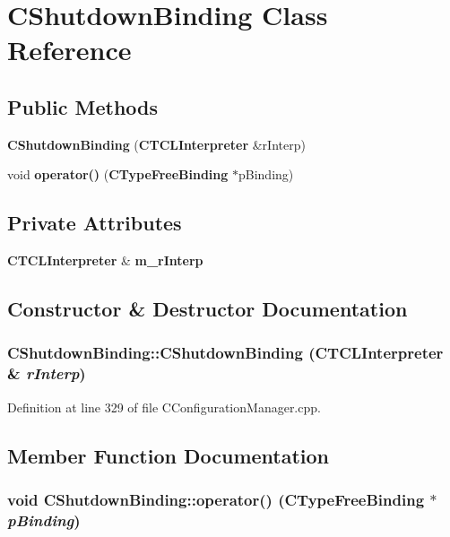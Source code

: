 \section{CShutdown\-Binding  Class Reference}
\label{classCShutdownBinding}
\subsection*{Public Methods}
\begin{CompactItemize}
\item 
{\bf CShutdown\-Binding} ({\bf CTCLInterpreter} \&r\-Interp)
\item 
void {\bf operator()} ({\bf CType\-Free\-Binding} $\ast$p\-Binding)
\end{CompactItemize}
\subsection*{Private Attributes}
\begin{CompactItemize}
\item 
{\bf CTCLInterpreter} \& {\bf m\_\-r\-Interp}
\end{CompactItemize}


\subsection{Constructor \& Destructor Documentation}
\subsubsection{\setlength{\rightskip}{0pt plus 5cm}CShutdown\-Binding::CShutdown\-Binding ({\bf CTCLInterpreter} \& {\em r\-Interp})\hspace{0.3cm}{\tt  [inline]}}\label{classCShutdownBinding_a0}




Definition at line 329 of file CConfiguration\-Manager.cpp.

\subsection{Member Function Documentation}
\subsubsection{\setlength{\rightskip}{0pt plus 5cm}void CShutdown\-Binding::operator() ({\bf CType\-Free\-Binding} $\ast$ {\em p\-Binding})\hspace{0.3cm}{\tt  [inline]}}\label{classCShutdownBinding_a1}




